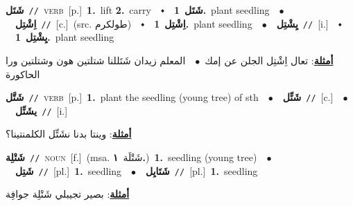\documentclass[10pt,a4paper,twoside]{article} %
\begin{document}
\begin{multicols}{2}
{\setlength\topsep{0pt}\textbf{\foreignlanguage{arabic}{شَتَل}}\ {\color{gray}\texttt{//}\color{black}}\ \textsc{verb}\ [p.]\ \textbf{1.}~lift  \textbf{2.}~carry\ \ $\smblkdiamond$\ \ \setlength\topsep{0pt}\textbf{\foreignlanguage{arabic}{شَتَل}}\ \textbf{1.}~plant seedling\ \ $\bullet$\ \ \setlength\topsep{0pt}\textbf{\foreignlanguage{arabic}{اِشْتِل}}\ {\color{gray}\texttt{//}\color{black}}\ [c.]\ (src. \color{gray}\foreignlanguage{arabic}{طولكرم}\color{black})\ \ $\smblkdiamond$\ \ \setlength\topsep{0pt}\textbf{\foreignlanguage{arabic}{اِشْتِل}}\ \textbf{1.}~plant seedling\ \ $\bullet$\ \ \setlength\topsep{0pt}\textbf{\foreignlanguage{arabic}{يِشْتِل}}\ {\color{gray}\texttt{//}\color{black}}\ [i.]\ \ $\smblkdiamond$\ \ \setlength\topsep{0pt}\textbf{\foreignlanguage{arabic}{يِشْتِل}}\ \textbf{1.}~plant seedling\  \begin{flushright}\color{gray}\foreignlanguage{arabic}{\textbf{\underline{\foreignlanguage{arabic}{أمثلة}}}: تعال اِشْتِل الجلن عن إمك\ $\bullet$\ \  المعلم زيدان شَتَللنا شتلتين هون وشتلتين ورا الحاكورة}\end{flushright}\color{black}} \vspace{2mm}

{\setlength\topsep{0pt}\textbf{\foreignlanguage{arabic}{شَتَّل}}\ {\color{gray}\texttt{//}\color{black}}\ \textsc{verb}\ [p.]\ \textbf{1.}~plant the seedling (young tree) of sth\ \ $\bullet$\ \ \setlength\topsep{0pt}\textbf{\foreignlanguage{arabic}{شَتِّل}}\ {\color{gray}\texttt{//}\color{black}}\ [c.]\ \ $\bullet$\ \ \setlength\topsep{0pt}\textbf{\foreignlanguage{arabic}{يشَتِّل}}\ {\color{gray}\texttt{//}\color{black}}\ [i.]\  \begin{flushright}\color{gray}\foreignlanguage{arabic}{\textbf{\underline{\foreignlanguage{arabic}{أمثلة}}}: وينتا بدنا نشَتِّل الكلمنتينا؟}\end{flushright}\color{black}} \vspace{2mm}

{\setlength\topsep{0pt}\textbf{\foreignlanguage{arabic}{شَتْلِة}}\ {\color{gray}\texttt{//}\color{black}}\ \textsc{noun}\ [f.]\ \color{gray}(msa. \foreignlanguage{arabic}{شَتْلَة}~\foreignlanguage{arabic}{\textbf{١.}})\color{black}\ \textbf{1.}~seedling (young tree)\ \ $\bullet$\ \ \setlength\topsep{0pt}\textbf{\foreignlanguage{arabic}{شَتِل}}\ {\color{gray}\texttt{//}\color{black}}\ [pl.]\ \textbf{1.}~seedling\ \ $\bullet$\ \ \setlength\topsep{0pt}\textbf{\foreignlanguage{arabic}{شَتَايِل}}\ {\color{gray}\texttt{//}\color{black}}\ [pl.]\ \textbf{1.}~seedling\  \begin{flushright}\color{gray}\foreignlanguage{arabic}{\textbf{\underline{\foreignlanguage{arabic}{أمثلة}}}: بصير تجيبلي شَتْلِة جوافِة}\end{flushright}\color{black}} \vspace{2mm}


\end{multicols}
\end{document}
